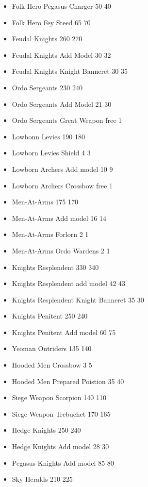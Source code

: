 \begin{multicols}{2}
\begin{itemize}
	\item Folk Hero Pegasus Charger 50 \costdown{} 40
	\item Folk Hero Fey Steed 65 \costdown{} 70
	\item Feudal Knights 260 \costup{} 270
	\item Feudal Knights Add Model 30 \costup{} 32
	\item Feudal Knights Knight Banneret 30 \costup{} 35
	\item Ordo Sergeants 230 \costup{} 240
	\item Ordo Sergeants Add Model 21 \costup{} 30
	\item Ordo Sergeants Great Weapon free \costup{} 1
	\item Lowbonn Levies 190 \costdown{} 180
	\item Lowborn Levies Shield 4 \costdown{} 3
	\item Lowborn Archers Add model 10 \costdown{} 9
	\item Lowborn Archers Crossbow free \costup{} 1
	\item Men-At-Arms 175 \costdown{} 170
	\item Men-At-Arms Add model 16 \costdown{} 14
	\item Men-At-Arms Forlorn 2 \costdown{} 1
	\item Men-At-Arms Ordo Wardens 2 \costdown{} 1
	\item Knights Resplendent 330 \costup{} 340
	\item Knights Resplendent add model 42 \costup{} 43
	\item Knights Resplendent Knight Banneret 35 \costdown{} 30
	\item Knights Penitent 250 \costdown{} 240
	\item Knights Penitent Add model 60 \costup{} 75
	\item Yeoman Outriders 135 \costup{} 140
	\item Hooded Men Crossbow 3 \costup{} 5
	\item Hooded Men Prepared Poistion 35 \costup{} 40
	\item Siege Weapon Scorpion 140 \costdown{} 110
	\item Siege Weapon Trebuchet 170 \costdown{} 165
	\item Hedge Knights 250 \costdown{} 240
	\item Hedge Knights Add model 28 \costup{} 30
	\item Pegasus Knights Add model 85 \costdown{} 80
	\item Sky Heralds 210 \costup{} 225

\end{itemize}
\end{multicols}
